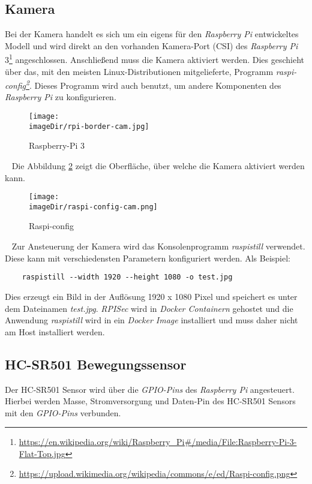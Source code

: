\subsection{Kamera}
Bei der Kamera handelt es sich um ein eigens für den \emph{Raspberry Pi} entwickeltes Modell und wird direkt an den vorhanden Kamera-Port (CSI) des \emph{Raspberry Pi} 3\footnote{\url{https://en.wikipedia.org/wiki/Raspberry_Pi\#/media/File:Raspberry-Pi-3-Flat-Top.jpg}} angeschlossen. Anschließend muss die Kamera aktiviert werden. Dies geschieht über das, mit den meisten Linux-Distributionen mitgelieferte, Programm \emph{raspi-config\footnote{\url{https://upload.wikimedia.org/wikipedia/commons/e/ed/Raspi-config.png}}}. Dieses Programm wird auch benutzt, um andere Komponenten des \emph{Raspberry Pi} zu konfigurieren.
\newpage
\begin{figure}[h]
	\centering
	\texttt{[image: \\imageDir/rpi-border-cam.jpg]}
	\caption{Raspberry-Pi 3}
	\label{fig:rpi-border-cam}
\end{figure}
\ \newline
Die Abbildung \ref{fig:raspi-config-cam} zeigt die Oberfläche, über welche die Kamera aktiviert werden kann.
\begin{figure}[h]
	\centering
	\texttt{[image: \\imageDir/raspi-config-cam.png]}
	\caption{Raspi-config}
	\label{fig:raspi-config-cam}
\end{figure}
\ \newline
Zur Ansteuerung der Kamera wird das Konsolenprogramm \emph{raspistill} verwendet. Diese kann mit verschiedensten Parametern konfiguriert werden. Als Beispiel:
\begin{verbatim}
	raspistill --width 1920 --height 1080 -o test.jpg
\end{verbatim}
Dies erzeugt ein Bild in der Auflösung 1920 x 1080 Pixel und speichert es unter dem Dateinamen \emph{test.jpg}. \emph{RPISec} wird in \emph{Docker Containern} gehostet und die Anwendung \emph{raspistill} wird in ein \emph{Docker Image} installiert und muss daher nicht am Host installiert werden.
\newpage

\subsection{HC-SR501 Bewegungssensor}
Der HC-SR501 Sensor wird über die \emph{GPIO-Pins} des \emph{Raspberry Pi} angesteuert. Hierbei werden Masse, Stromversorgung und Daten-Pin des HC-SR501 Sensors mit den \emph{GPIO-Pins} verbunden. 

